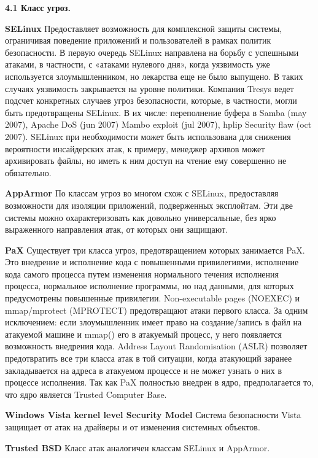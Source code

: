 {\bfseries 4.1 Класс угроз.}

\bigskip

{\bfseries SELinux} 
Предоставляет возможность для комплексной защиты системы, ограничивая поведение приложений и пользователей в рамках политик безопасности. В первую очередь SELinux направлена на борьбу с успешными атаками, в частности, с «атаками нулевого дня», когда уязвимость уже используется злоумышленником, но лекарства еще не было выпущено. В таких случаях уязвимость закрывается на уровне политики. Компания Tresys ведет подсчет конкретных случаев угроз безопасности, которые, в частности, могли быть предотвращены SELinux. В их числе: переполнение буфера в Samba (may 2007), Apache DoS (jun 2007) Mambo exploit (jul 2007), hplip Security flaw (oct 2007). SELinux при необходимости может быть использована для снижения вероятности инсайдерских атак, к примеру, менеджер архивов может архивировать файлы, но иметь к ним доступ на чтение ему совершенно не обязательно. 

\bigskip
{\bfseries AppArmor}
По классам угроз во многом схож с SELinux, предоставляя возможности для изоляции приложений, подверженных эксплойтам. Эти две системы можно охарактеризовать как довольно универсальные, без ярко выраженного направления атак, от которых они защищают.

\bigskip
{\bfseries PaX } 
Существует три класса угроз, предотвращением которых занимается PaX. Это внедрение и исполнение кода с повышенными привилегиями, исполнение кода самого процесса путем изменения нормального течения исполнения процесса, нормальное исполнение программы, но над данными, для которых предусмотрены повышенные привилегии. Non-executable pages (NOEXEC) и mmap/mprotect (MPROTECT) предотвращают атаки первого класса. За одним исключением: если злоумышленник имеет право на создание/запись в файл на атакуемой машине и mmap() его в атакуемый процесс, у него появляется возможность внедрения кода. Address Layout Randomisation (ASLR) позволяет предотвратить все три класса атак в той ситуации, когда атакующий заранее закладывается на адреса в атакуемом процессе и не может узнать о них в процессе исполнения. Так как PaX полностью внедрен в ядро, предполагается то, что ядро является Trusted Computer Base. 

\bigskip
{\bfseries Windows Vista kernel level Security Model }
Система безопасности Vista защищает от атак на драйверы и от изменения системных объектов. 

\bigskip
{\bfseries Trusted BSD} 
Класс атак аналогичен классам SELinux и AppArmor. 

